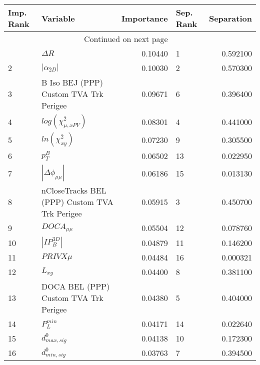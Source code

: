 \usepackage{lscape}

\begin{landscape}
\begin{longtable}{llrlr}
\toprule
Imp. Rank &                                       Variable &  Importance & Sep. Rank &  Separation \\
\midrule
\endhead
\midrule
\multicolumn{3}{r}{{Continued on next page}} \\
\midrule
\endfoot

\bottomrule
\endlastfoot
        1 &                                     $\Delta R$ &     0.10440 &         1 &    0.592100 \\
        2 &                                $|\alpha_{2D}|$ &     0.10030 &         2 &    0.570300 \\
        3 &         B Iso BEJ (PPP) Custom TVA Trk Perigee &     0.09671 &         6 &    0.396400 \\
        4 &                      $log(\chi^{2}_{\mu,xPV})$ &     0.08301 &         4 &    0.441000 \\
        5 &                            $ln(\chi^{2}_{xy})$ &     0.07230 &         9 &    0.305500 \\
        6 &                                      $p^B_{T}$ &     0.06502 &        13 &    0.022950 \\
        7 &                       $|\Delta \phi_{\mu\mu}|$ &     0.06186 &        15 &    0.013130 \\
        8 &  nCloseTracks BEL (PPP) Custom TVA Trk Perigee &     0.05915 &         3 &    0.450700 \\
        9 &                                $DOCA_{\mu\mu}$ &     0.05504 &        12 &    0.078760 \\
       10 &                                $|IP_{B}^{3D}|$ &     0.04879 &        11 &    0.146200 \\
       11 &                                     $PRIVX\mu$ &     0.04484 &        16 &    0.000321 \\
       12 &                                       $L_{xy}$ &     0.04400 &         8 &    0.381100 \\
       13 &          DOCA BEL (PPP) Custom TVA Trk Perigee &     0.04380 &         5 &    0.404000 \\
       14 &                                  $P^{min}_{L}$ &     0.04171 &        14 &    0.022640 \\
       15 &                               $d^0_{max, sig}$ &     0.04138 &        10 &    0.172300 \\
       16 &                               $d^0_{min, sig}$ &     0.03763 &         7 &    0.394500 \\
\end{longtable}

\end{landscape}
